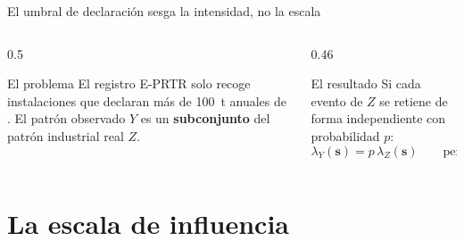 \documentclass[11pt,aspectratio=169]{beamer}
\newcommand{\loc}{\bm{s}}                    %
\begin{document}
\begin{frame}{El umbral de declaración sesga la intensidad, no la escala}

\vspace{2mm}
\begin{columns}[T]
\begin{column}{0.5\textwidth}
\begin{block}{El problema}
\small
El registro E-PRTR solo recoge instalaciones que declaran más de
\SI{100}{\tonne} anuales de . El patrón observado $Y$ es un
\textbf{subconjunto} del patrón industrial real $Z$.
\end{block}
\end{column}
\begin{column}{0.46\textwidth}
\begin{block}{El resultado}
\small
Si cada evento de $Z$ se retiene de forma independiente con probabilidad $p$:
\[ \lambda_Y(\loc) = p\,\lambda_Z(\loc) \qquad\text{pero}\qquad
   K_Y(t) = K_Z(t) \]
\end{block}
\end{column}
\end{columns}

\vspace{3mm}
\begin{center}
\end{center}

\vspace{2mm}

\end{frame}

\section{La escala de influencia}
\end{document}
